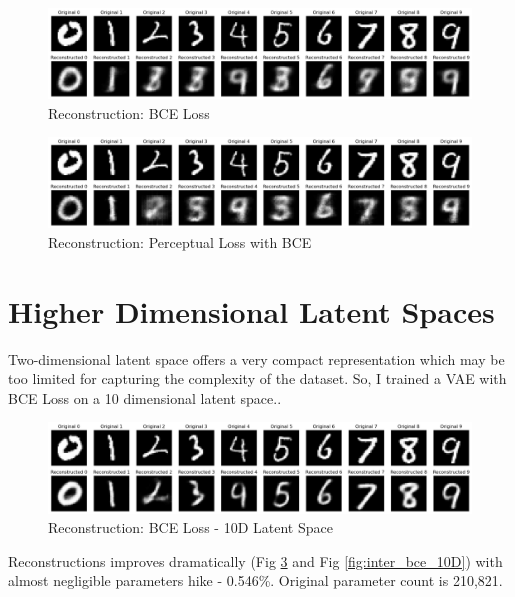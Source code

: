 \documentclass[12pt]{article}
\begin{document}
\begin{figure}[h]
\centering
\includegraphics[width=1\linewidth]{report_images/kaiming_init/reconstruction.png}
\caption{\label{fig:recon_bce}Reconstruction: BCE Loss}
\end{figure}

\begin{figure}[h]
\centering
\includegraphics[width=1\linewidth]{report_images/percep_bce/reconstruction.png}
\caption{\label{fig:recon_percep_bce}Reconstruction: Perceptual Loss with BCE}
\end{figure}


\section{Higher Dimensional Latent Spaces}
Two-dimensional latent space offers a very compact representation which may be too limited for capturing the complexity of the dataset. So, I trained a VAE with BCE Loss on a 10 dimensional latent space.. 
\begin{figure}[h]
\centering
\includegraphics[width=1\linewidth]{report_images/bce_10D/reconstruction.png}
\caption{\label{fig:recon_bce_10D}Reconstruction: BCE Loss - 10D Latent Space}
\end{figure}

\noindent
Reconstructions improves dramatically (Fig \ref{fig:recon_bce_10D} and Fig \ref{fig:inter_bce_10D}) with almost negligible parameters hike - 0.546\%. Original parameter count is 210,821.
\end{document}
